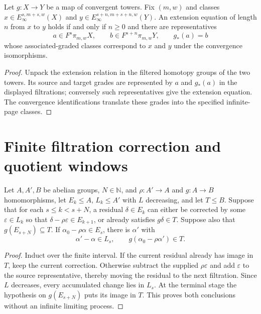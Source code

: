 \begin{theorem}
\label{sem:ProofTools:extension-representatives}
Let $g:X\to Y$ be a map of convergent towers. Fix $(m,w)$ and classes $x\in E_\infty^{s,m+s,w}(X)$ and $y\in E_\infty^{s+n,m+s+n,w}(Y)$. An extension equation of length $n$ from $x$ to $y$ holds if and only if $n\geq0$ and there are representatives
\[a\in F^s\pi_{m,w}X,\qquad b\in F^{s+n}\pi_{m,w}Y,\qquad g_*(a)=b\]
whose associated-graded classes correspond to $x$ and $y$ under the convergence isomorphisms.
\end{theorem}
\begin{proof}
Unpack the extension relation in the filtered homotopy groups of the two towers. Its source and target grades are represented by $a$ and $g_*(a)$ in the displayed filtrations; conversely such representatives give the extension equation. The convergence identifications translate these grades into the specified infinite-page classes.
\end{proof}

\section{Finite filtration correction and quotient windows}

\begin{theorem}
\label{sem:ProofTools:finite-correction}
Let $A,A',B$ be abelian groups, $N\in\mathbb N$, and $\rho:A'\to A$ and $g:A\to B$ homomorphisms, let $E_k\leq A$, $L_k\leq A'$ with $L$ decreasing, and let $T\leq B$. Suppose that for each $s\leq k<s+N$, a residual $\delta\in E_k$ can either be corrected by some $\varepsilon\in L_k$ so that $\delta-\rho\varepsilon\in E_{k+1}$, or already satisfies $g\delta\in T$. Suppose also that $g(E_{s+N})\subseteq T$. If $\alpha_0-\rho\alpha\in E_s$, there is $\alpha'$ with
\[\alpha'-\alpha\in L_s,\qquad g(\alpha_0-\rho\alpha')\in T.\]
\end{theorem}
\begin{proof}
Induct over the finite interval. If the current residual already has image in $T$, keep the current correction. Otherwise subtract the supplied $\rho\varepsilon$ and add $\varepsilon$ to the source representative, thereby moving the residual to the next filtration. Since $L$ decreases, every accumulated change lies in $L_s$. At the terminal stage the hypothesis on $g(E_{s+N})$ puts its image in $T$. This proves both conclusions without an infinite limiting process.
\end{proof}

